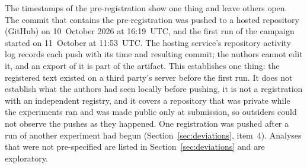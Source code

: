\documentclass[conference]{IEEEtran}
\begin{document}
The timestamps of the pre-registration show one thing and leave others open. The commit that contains the
pre-registration was pushed to a hosted repository (GitHub) on 10~October 2026 at 16:19~UTC, and
the first run of the campaign started on 11~October at 11:53~UTC. The hosting service's
repository activity log records each push with its time and resulting commit; the authors
cannot edit it, and an export of it is part of the artifact. This establishes one thing: the registered text existed on a third
party's server before the first run. It does not establish what the authors had seen locally
before pushing, it is not a registration with an independent registry, and it covers a
repository that was private while the experiments ran and was made public only at submission, so outsiders could not observe the pushes as they happened. One
registration was pushed after a run of another experiment had begun
(Section~\ref{sec:deviations}, item~4). Analyses that were not pre-specified are listed in
Section~\ref{sec:deviations} and are exploratory.
\end{document}
